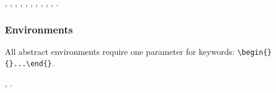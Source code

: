 , , , , , , , , , , .

\subsubsection{Environments}
All abstract environments require one parameter for keywords: \verb|\begin{}{}...\end{}|.

, .